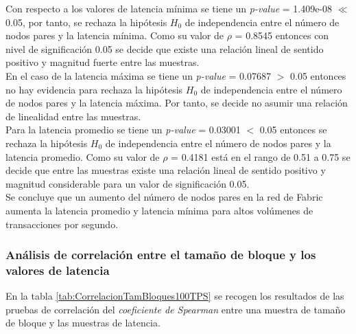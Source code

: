 \newpage

Con respecto a los valores de latencia m\'inima se tiene un \emph{p-value} = 1.409e-08 $\ll$ 0.05, por tanto, se rechaza la hip\'otesis $H_0$ de independencia entre el n\'umero de nodos pares y la latencia m\'inima. Como su valor de $\rho$ = 0.8545 entonces con nivel de significaci\'on 0.05 se decide que existe una relaci\'on lineal de sentido positivo y magnitud fuerte entre las muestras.\\
 
En el caso de la latencia m\'axima se tiene un \emph{p-value} = 0.07687 $>$ 0.05 entonces no hay evidencia para rechaza la hip\'otesis $H_0$ de independencia entre el n\'umero de nodos pares y la latencia m\'axima. Por tanto, se decide no asumir una relaci\'on de linealidad entre las muestras.\\

Para la latencia promedio se tiene un \emph{p-value} = 0.03001 $<$ 0.05 entonces se rechaza la hip\'otesis $H_0$ de independencia entre el n\'umero de nodos pares y la latencia promedio. Como su valor de $\rho$ = 0.4181 est\'a en el rango de 0.51 a 0.75 se decide que entre las muestras existe una relaci\'on lineal de sentido positivo y magnitud considerable para un valor de significaci\'on 0.05.\\
 
 
Se concluye que un aumento del n\'umero de nodos pares en la red de Fabric aumenta la latencia promedio y latencia m\'inima para altos vol\'umenes de transacciones por segundo.\\

\subsubsection{An\'alisis de correlaci\'on entre el tama\~no de bloque y los valores de latencia}
En la tabla \ref{tab:CorrelacionTamBloques100TPS} se recogen los resultados de las pruebas de correlaci\'on del \emph{coeficiente de Spearman} entre una muestra de tama\~no de bloque y las muestras de latencia.\\

\begin{table}[h]
\centering
{}
\caption{Resultados de aplicar el \emph{coeficiente de correlaci\'on de Spearman} entre el tama\~no de los bloques y las muestras de latencia en redes con un flujo de 100 TPS.}
\label{tab:CorrelacionTamBloques100TPS}
\end{table}

